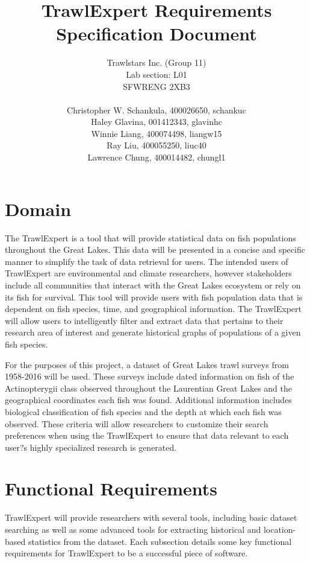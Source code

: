 \documentclass{article}
\begin{document}
\title{\textbf{TrawlExpert Requirements Specification Document}}
\author{Trawlstars Inc. (Group 11) \\ Lab section: L01 \\SFWRENG 2XB3 \\ \\ Christopher W. Schankula, 400026650, schankuc \\ Haley Glavina, 001412343, glavinhc \\ Winnie Liang, 400074498, liangw15 \\ Ray Liu, 400055250, liuc40 \\ Lawrence Chung, 400014482, chungl1}


\maketitle

\newpage


\section{Domain}
The TrawlExpert is a tool that will provide statistical data on fish populations throughout the Great Lakes. This data will be presented in a concise and specific manner to simplify the task of data retrieval for users. The intended users of TrawlExpert are environmental and climate researchers, however stakeholders include all communities that interact with the Great Lakes ecosystem or rely on its fish for survival. This tool will provide users with fish population data that is dependent on fish species, time, and geographical information. The TrawlExpert will allow users to intelligently filter and extract data that pertains to their research area of interest and generate historical graphs of populations of a given fish species.

For the purposes of this project, a dataset of Great Lakes trawl surveys from 1958-2016 will be used. These surveys include dated information on fish of the Actinopterygii class observed throughout the Laurentian Great Lakes and the geographical coordinates each fish was found. Additional information includes biological classification of fish species and the depth at which each fish was observed. These criteria will allow researchers to customize their search preferences when using the TrawlExpert to ensure that data relevant to each user?s highly specialized research is generated.


\section{Functional Requirements}
TrawlExpert will provide researchers with several tools, including basic dataset searching as well as some advanced tools for extracting historical and location-based statistics from the dataset. Each subsection details some key functional requirements for TrawlExpert to be a successful piece of software.
\end{document}
